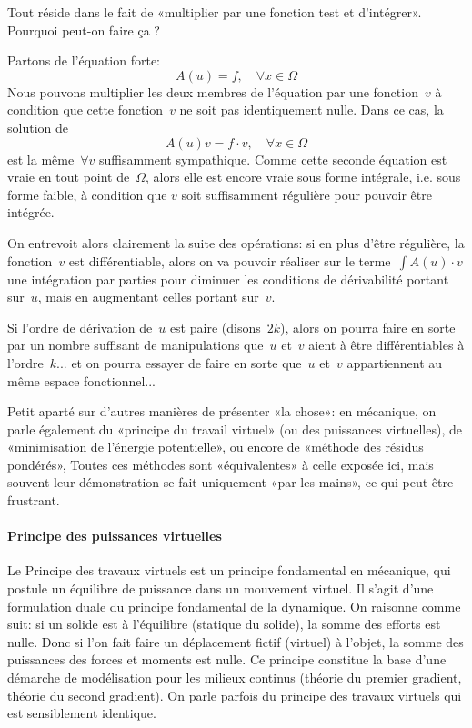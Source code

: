 \begin{remarque}[Justification]
Tout réside dans le fait de «multiplier par une fonction test et d'intégrer».
Pourquoi peut-on faire ça ?

Partons de l'équation forte:
\begin{equation}A(u)=f,\quad \forall x\in\Omega\end{equation}
Nous pouvons multiplier les deux membres de l'équation par une fonction~$v$ à condition que cette fonction~$v$ ne soit pas identiquement nulle. Dans ce cas, la solution de 
\begin{equation}A(u)v=f\cdot v,\quad \forall x\in\Omega\end{equation} 
est la même~$\forall v$ suffisamment sympathique.
Comme cette seconde équation est vraie en tout point de~$\Omega$, alors elle est encore vraie sous forme intégrale, i.e. sous forme faible, à condition que $v$ soit suffisamment régulière pour pouvoir être intégrée.

On entrevoit alors clairement la suite des opérations: si en plus d'être régulière, la fonction~$v$ est différentiable, alors on va pouvoir réaliser sur le terme~$\int A(u)\cdot v$ une intégration par parties pour diminuer les conditions de dérivabilité portant sur~$u$, mais en augmentant celles portant sur~$v$.

Si l'ordre de dérivation de~$u$ est paire (disons~$2k$), alors on pourra faire en sorte par un nombre suffisant de manipulations que~$u$ et~$v$ aient à être différentiables à l'ordre~$k$... et on pourra essayer de faire en sorte que~$u$ et~$v$ appartiennent au même espace fonctionnel...%
\end{remarque}

\begin{remarque}
Petit aparté sur d'autres manières de présenter «la chose»: en mécanique, on parle également du «principe du travail virtuel» (ou des puissances virtuelles), de «minimisation de l'énergie potentielle», ou encore de «méthode des résidus pondérés»,
Toutes ces méthodes sont «équivalentes» à celle exposée ici, mais souvent leur démonstration se fait uniquement «par les mains», ce qui peut être frustrant.
\end{remarque}
%
\paragraph{Principe des puissances virtuelles}
Le Principe des travaux virtuels est un principe fondamental en mécanique, qui postule un équilibre de puissance dans un mouvement virtuel. Il s'agit d'une formulation duale du principe fondamental de la dynamique. On raisonne comme suit: si un solide est à l'équilibre (statique du solide), la somme des efforts est nulle. Donc si l'on fait faire un déplacement fictif (virtuel) à l'objet, la somme des puissances des forces et moments est nulle. Ce principe constitue la base d'une démarche de modélisation pour les milieux continus (théorie du premier gradient, théorie du second gradient). On parle parfois du principe des travaux virtuels qui est sensiblement identique.

